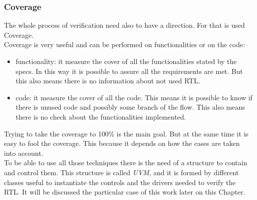 \bigskip

\subsubsection{Coverage}
The whole process of verification need also to have a direction. For that is used Coverage. \\

Coverage is very useful and can be performed on functionalities or on the code:
\begin{itemize}
    \item functionality: it measure the cover of all the functionalities stated by the specs. In this way it is possible to assure all the requirements are met. But this also means there is no information about not used RTL.
    
    \item code: it measure the cover of all the code. This means it is possible to know if there is unused code and possibly some branch of the flow. This also means there is no check about the functionalities implemented.

\end{itemize}

Trying to take the coverage to 100\% is the main goal. But at the same time it is easy to fool the coverage. This because it depends on how the cases are taken into account. \\

To be able to use all those techniques there is the need of a structure to contain and control them.
This structure is called \textit{UVM}, and it is formed by different classes useful to instantiate the controls and the drivers needed to verify the RTL. It will be discussed the particular case of this work later on this Chapter.

